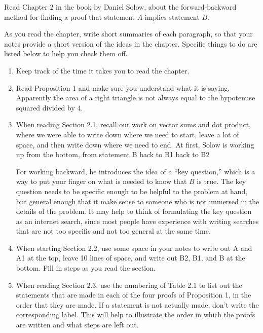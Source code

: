 
Read Chapter 2 in the book by Daniel Solow, about the forward-backward method for finding a proof that statement $A$ implies statement $B$.

As you read the chapter, write short summaries of each paragraph, so that your notes provide a short version of the ideas in the chapter.
Specific things to do are listed below to help you check them off.

\begin{enumerate}
\item Keep track of the time it takes you to read the chapter.

\item Read Proposition 1 and make sure you understand what it is saying.
Apparently the area of a right triangle is not always equal to the hypotenuse squared divided by 4.

\item When reading Section 2.1, recall our work on vector sums and dot product, where we were able to write down where we need to start, leave a lot of space, and then write down where we need to end.
At first, Solow is working up from the bottom, from statement B back to B1 back to B2

For working backward, he introduces the idea of a ``key question,'' which is a way to put your finger on what is needed to know that $B$ is true.
The key question needs to be specific enough to be helpful to the problem at hand, but general enough that it make sense to someone who is not immersed in the details of the problem.
It may help to think of formulating the key question as an internet search, since most people have experience with writing searches that are not too specific and not too general at the same time.

\item When starting Section 2.2, use some space in your notes to write out A and A1 at the top, leave 10 lines of space, and write out B2, B1, and B at the bottom.
Fill in steps as you read the section.  

\item When reading Section 2.3, use the numbering of Table 2.1 to list out the statements that are made in each of the four proofs of Proposition 1, in the order that they are made.
If a statement is not actually made, don't write the corresponding label.
This will help to illustrate the order in which the proofs are written and what steps are left out.


\end{enumerate}
